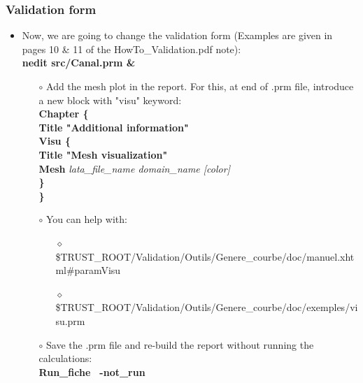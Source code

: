 \documentclass[10pt]{beamer}
\begin{document}
\begin{frame}
\frametitle{Validation form}
\begin{block}{}

\begin{itemize}
\item Now, we are going to change the validation form (Examples are given in pages 10 \& 11 of the HowTo\_Validation.pdf note):\\
\textbf{nedit src/Canal.prm \&}
    \begin{itemize}
    \item [$\circ$] Add the mesh plot in the report. For this, at end of .prm file, introduce a new block with "visu" keyword:\\
    \textbf{Chapter \{ }  \\
    \hspace{0.3cm} \textbf{Title "Additional information"} \\
    \hspace{0.3cm} \textbf{Visu \{ } \\
    \hspace{0.6cm} \textbf{Title "Mesh visualization" } \\
    \hspace{0.6cm} \textbf{Mesh} \textit {lata\_file\_name  domain\_name [color]} \\
    \hspace{0.3cm} \textbf{\} } \\
    \textbf{\} } \\
    \item [$\circ$] You can help with:
        \begin{itemize}
        \item [$\diamond$] {\scriptsize{\$TRUST\_ROOT/Validation/Outils/Genere\_courbe/doc/manuel.xhtml\#paramVisu}}
        \item [$\diamond$] {\scriptsize{\$TRUST\_ROOT/Validation/Outils/Genere\_courbe/doc/exemples/visu.prm}}
        \end{itemize}
    \item [$\circ$] Save the .prm file and re-build the report without running the calculations:\\
    \textbf{Run\_fiche \, -not\_run} \\
    \end{itemize}
\end{itemize}

\end{block}
\end{frame}
\end{document}
